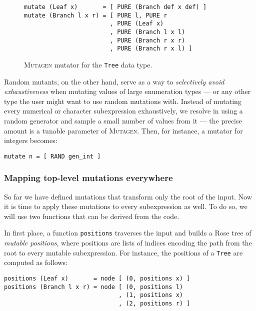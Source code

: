 \documentclass[sigconf, anonymous, review]{acmart}
\newcommand{\mutagen}{\textsc{Mutagen}\xspace}
\begin{document}
\begin{figure}[b]
\begin{verbatim}
mutate (Leaf x)       = [ PURE (Branch def x def) ]
mutate (Branch l x r) = [ PURE l, PURE r
                        , PURE (Leaf x)
                        , PURE (Branch l x l)
                        , PURE (Branch r x r)
                        , PURE (Branch r x l) ]
\end{verbatim}
\vspace{-5pt}
\caption{\label{fig:mutagen:mutator}\mutagen mutator for the \texttt{Tree} data
  type.}
\end{figure}

%
Random mutants, on the other hand, serve as a way to \emph{selectively avoid
  exhaustiveness} when mutating values of large enumeration types --- or any
other type the user might want to use random mutations with.
%
Instead of mutating every numerical or character subexpression exhaustively, we
resolve in using a random generator and sample a small number of values from it
--- the precise amount is a tunable parameter of \mutagen.
%
Then, for instance, a mutator for integers becomes:

\begin{verbatim}
mutate n = [ RAND gen_int ]
\end{verbatim}


\subsubsection{Mapping top-level mutations everywhere}

So far we have defined mutations that transform only the root of the input.
%
Now it is time to apply these mutations to every subexpression as well.
%
To do so, we will use two functions that can be derived from the code.

In first place, a function \texttt{positions} traverses the input and builds a
Rose tree of \emph{mutable positions}, where positions are lists of indices
encoding the path from the root to every mutable subexpression.
%
For instance, the positions of a \texttt{Tree} are computed as follows:

\begin{verbatim}
positions (Leaf x)       = node [ (0, positions x) ]
positions (Branch l x r) = node [ (0, positions l)
                                , (1, positions x)
                                , (2, positions r) ]
\end{verbatim}
\end{document}
